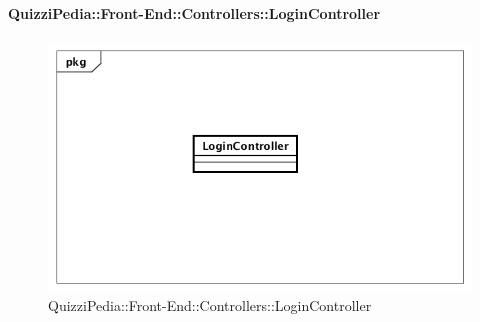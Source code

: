 \paragraph{QuizziPedia::Front-End::Controllers::LoginController}
\begin{figure}
	\centering
	\includegraphics[scale=0.45]{UML/Classi/Front-End/QuizziPedia_Front-end_Controller_LoginController.png}
	\caption{QuizziPedia::Front-End::Controllers::LoginController}
\end{figure}
